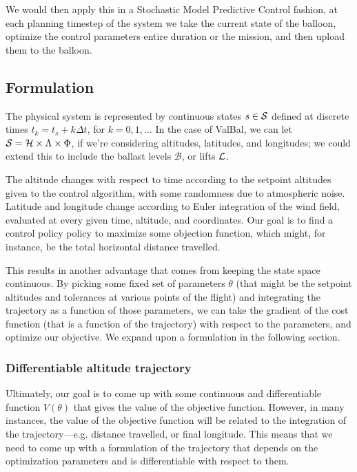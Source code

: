 \documentclass[11pt]{scrartcl} %
\begin{document}
We would then apply this in a Stochastic Model Predictive Control fashion, at each planning timestep of the system we take the current state of the balloon, optimize the control parameters entire duration or the mission, and then upload them to the balloon.

\subsection{Formulation}
The physical system is represented by continuous states $s\in\mathcal{S}$ defined at discrete times $t_k=t_s + k \Delta t$, for $k=0,1,\dots$ In the case of ValBal, we can let $\mathcal{S}=\mathcal{H}\times\Lambda\times\Phi$, if we're considering altitudes, latitudes, and longitudes; we could extend this to include the ballast levels $\mathcal{B}$, or lifts $\mathcal{L}$.

The altitude changes with respect to time according to the setpoint altitudes given to the control algorithm, with some randomness due to atmospheric noise. Latitude and longitude change according to Euler integration of the wind field, evaluated at every given time, altitude, and coordinates. Our goal is to find a control policy policy  to maximize some objection function, which might, for instance, be the total horizontal distance travelled.

This results in another advantage that comes from keeping the state space continuous. By picking some fixed set of parameters $\theta$ (that might be the setpoint altitudes and tolerances at various points of the flight) and integrating the trajectory as a function of those parameters, we can take the gradient of the cost function (that is a function of the trajectory) with respect to the parameters, and optimize our objective. We expand upon a formulation in the following section.

\subsubsection{Differentiable altitude trajectory}
Ultimately, our goal is to come up with some continuous and differentiable function $V(\theta)$ that gives the value of the objective function. However, in many instances, the value of the objective function will be related to the integration of the trajectory---e.g. distance travelled, or final longitude. This means that we need to come up with a formulation of the trajectory that depends on the optimization parameters and is differentiable with respect to them.
\end{document}
